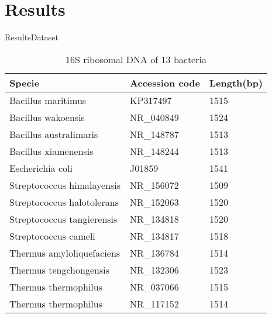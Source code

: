 \documentclass[10pt]{beamer}
\newcommand{\1}{
	\setbeamertemplate{background}{
		\texttt{[image: img/1\_dna]}
		\tikz[overlay] \fill[fill opacity=0.75,fill=white] (0,0) rectangle (-\paperwidth,\paperheight);
	}
}
\begin{document}
\section{Results}


\begin{frame}{Results}{Dataset}
	\begin{table}[]
		\caption{16S ribosomal DNA of 13 bacteria}
		\begin{tabular}{lll}
			\textbf{Specie}                     & \textbf{Accession code} & \textbf{Length(bp) } \\
			\hline
			Bacillus maritimus         & KP317497       & 1515       \\
			Bacillus wakoensis         & NR\_040849     & 1524       \\
			Bacillus australimaris     & NR\_148787     & 1513       \\
			Bacillus xiamenensis       & NR\_148244     & 1513       \\
			Escherichia coli           & J01859         & 1541       \\
			Streptococcus himalayensis & NR\_156072     & 1509       \\
			Streptococcus halotolerans & NR\_152063     & 1520       \\
			Streptococcus tangierensis & NR\_134818     & 1520       \\
			Streptococcus cameli       & NR\_134817     & 1518       \\
			Thermus amyloliquefaciens  & NR\_136784     & 1514       \\
			Thermus tengchongensis     & NR\_132306     & 1523       \\
			Thermus thermophilus       & NR\_037066     & 1515       \\
			Thermus thermophilus       & NR\_117152     & 1514      \\
			\hline
		\end{tabular}
	\end{table}
\end{frame}
\end{document}
